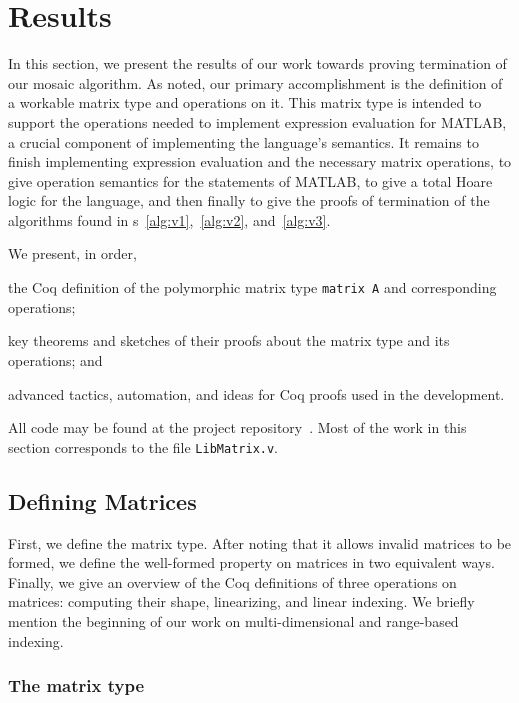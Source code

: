\documentclass[11pt,conference]{IEEEtran}
\newcommand{\matlab}{MATLAB}
\newcommand{\mmatlab}{\textmu\matlab}
\theoremstyle{plain} %
\theoremstyle{definition}
\theoremstyle{remark}
\begin{document}
\section{Results}\label{S:results}

In this section, we present the results of our work towards proving termination
of our mosaic algorithm. As noted, our primary accomplishment is the definition
of a workable matrix type and operations on it. This matrix type is intended to
support the operations needed to implement expression evaluation for \mmatlab, a
crucial component of implementing the language's semantics. It remains to finish
implementing expression evaluation and the necessary matrix operations, to give
operation semantics for the statements of \mmatlab, to give a total Hoare logic
for the language, and then finally to give the proofs of termination of the
algorithms found in \figurename{s}~\ref{alg:v1},~\ref{alg:v2}, and~\ref{alg:v3}.

We present, in order,
\begin{inlist}
\item the Coq definition of the polymorphic matrix type \texttt{matrix A} and
    corresponding operations;
\item key theorems and sketches of their proofs about the matrix type and its
    operations; and
\item advanced tactics, automation, and ideas for Coq proofs used in the
    development.
\end{inlist}


All code may be found at the project repository~\cite{zelda_mosaic_proof}. Most
of the work in this section corresponds to the file \texttt{LibMatrix.v}.

\subsection{Defining Matrices}\label{S:matrix_defn}

First, we define the matrix type. After noting that it allows invalid matrices
to be formed, we define the well-formed property on matrices in two equivalent
ways. Finally, we give an overview of the Coq definitions of three operations on
matrices: computing their shape, linearizing, and linear indexing. We briefly
mention the beginning of our work on multi-dimensional and range-based indexing.

\subsubsection{The matrix type}
\end{document}
